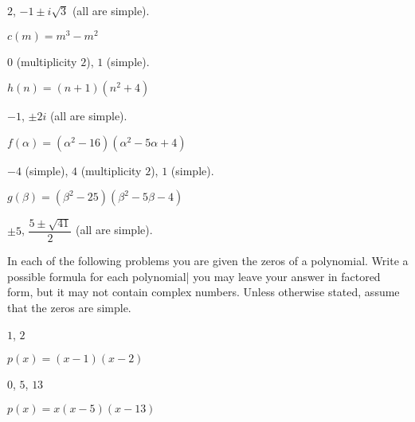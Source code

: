 \begin{exercises}
\begin{problem}[Zeros]
\begin{multicols}{3}
\begin{subproblem}
\begin{shortsolution}
			$2$, $-1\pm i\sqrt{3}$ (all are simple).
		\end{shortsolution}
	\end{subproblem}
	\begin{subproblem}
		$c(m)=m^3-m^2$
		\begin{shortsolution}
			$0$ (multiplicity $2$), $1$ (simple).
		\end{shortsolution}
	\end{subproblem}
	\begin{subproblem}
		$h(n)=(n+1)(n^2+4)$ 
		\begin{shortsolution}
			$-1$, $\pm 2i$ (all are simple).
		\end{shortsolution}
	\end{subproblem}
	\begin{subproblem}
		$f(\alpha)=(\alpha^2-16)(\alpha^2-5\alpha+4)$ 
		\begin{shortsolution}
			$-4$ (simple), $4$ (multiplicity $2$), $1$ (simple).
		\end{shortsolution}
	\end{subproblem}
	\begin{subproblem}
		$g(\beta)=(\beta^2-25)(\beta^2-5\beta-4)$ 
		\begin{shortsolution}
			$\pm 5$, $\dfrac{5\pm\sqrt{41}}{2}$ (all are simple).
		\end{shortsolution}
	\end{subproblem}
\end{multicols}
\end{problem}
\begin{problem}
In each of the following problems you are given the zeros of a polynomial. 
Write a possible formula for each polynomial| you may leave your 
answer in factored form, but it may not contain complex numbers. Unless
otherwise stated, assume that the zeros are simple.
\begin{multicols}{3}
	\begin{subproblem}
		$1$, $2$ 
		\begin{shortsolution}
			$p(x)=(x-1)(x-2)$
		\end{shortsolution}
	\end{subproblem}
	\begin{subproblem}
		$0$, $5$, $13$ 
		\begin{shortsolution}
			$p(x)=x(x-5)(x-13)$
		\end{shortsolution}

\end{subproblem}
\end{multicols}
\end{problem}
\end{exercises}
